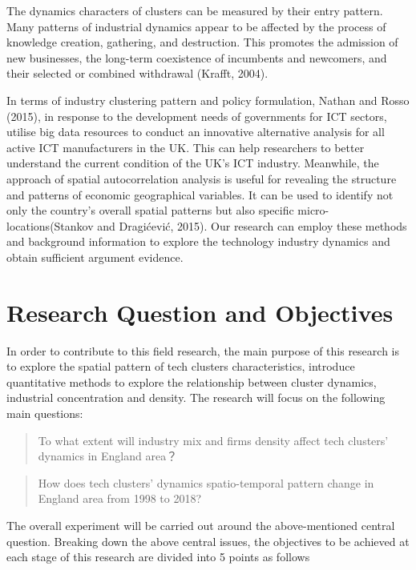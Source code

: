 \documentclass[
  12pt,
  oneside]{book}
\begin{document}
The dynamics characters of clusters can be measured by their entry pattern. Many patterns of industrial dynamics appear to be affected by the process of knowledge creation, gathering, and destruction. This promotes the admission of new businesses, the long-term coexistence of incumbents and newcomers, and their selected or combined withdrawal (Krafft, 2004).

In terms of industry clustering pattern and policy formulation, Nathan and Rosso (2015), in response to the development needs of governments for ICT sectors, utilise big data resources to conduct an innovative alternative analysis for all active ICT manufacturers in the UK. This can help researchers to better understand the current condition of the UK's ICT industry. Meanwhile, the approach of spatial autocorrelation analysis is useful for revealing the structure and patterns of economic geographical variables. It can be used to identify not only the country's overall spatial patterns but also specific micro-locations(Stankov and Dragićević, 2015). Our research can employ these methods and background information to explore the technology industry dynamics and obtain sufficient argument evidence.

\hypertarget{research-question-and-objectives}{%
\section{Research Question and Objectives}\label{research-question-and-objectives}}

In order to contribute to this field research, the main purpose of this research is to explore the spatial pattern of tech clusters characteristics, introduce quantitative methods to explore the relationship between cluster dynamics, industrial concentration and density. The research will focus on the following main questions:

\begin{quote}
To what extent will industry mix and firms density affect tech clusters' dynamics in England area？
\end{quote}

\begin{quote}
How does tech clusters' dynamics spatio-temporal pattern change in England area from 1998 to 2018?
\end{quote}

The overall experiment will be carried out around the above-mentioned central question. Breaking down the above central issues, the objectives to be achieved at each stage of this research are divided into 5 points as follows
\end{document}
